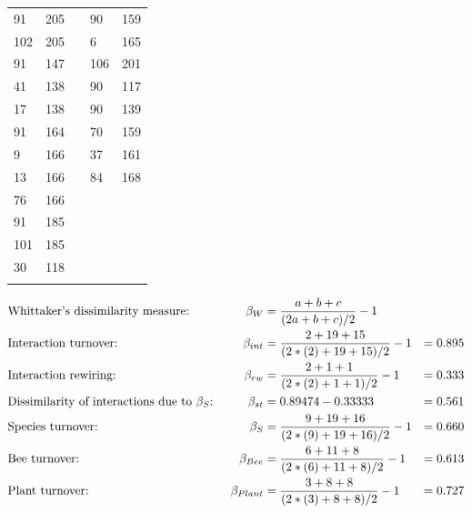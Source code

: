 \documentclass[11pt]{article}
\begin{document}
\begin{table}[h]
\begin{tabular}{|l|l|lll}
\cellcolor[HTML]{E3E5F9}91 & 205 & \multicolumn{1}{l|}{} & \multicolumn{1}{l|}{\cellcolor[HTML]{E3E5F9}90} & \multicolumn{1}{l|}{159} \\ \hhline{--~--}
102 & 205 & \multicolumn{1}{l|}{} & \multicolumn{1}{l|}{\cellcolor[HTML]{E3E5F9}6} & \multicolumn{1}{l|}{165} \\ \hhline{--~--} 
\cellcolor[HTML]{E3E5F9}91 & \cellcolor[HTML]{DDF4DC}147 & \multicolumn{1}{l|}{} & \multicolumn{1}{l|}{106} & \multicolumn{1}{l|}{201} \\ \hhline{--~--}
41 & 138 & \multicolumn{1}{l|}{} & \multicolumn{1}{l|}{\cellcolor[HTML]{E3E5F9}90} & \multicolumn{1}{l|}{117} \\ \hhline{--~--}
\cellcolor[HTML]{E3E5F9}17 & 138 & \multicolumn{1}{l|}{} & \multicolumn{1}{l|}{\cellcolor[HTML]{E3E5F9}90} & \multicolumn{1}{l|}{139} \\ \hhline{--~--}
\cellcolor[HTML]{E3E5F9}91 & 164 & \multicolumn{1}{l|}{} & \multicolumn{1}{l|}{70} & \multicolumn{1}{l|}{159} \\ \hhline{--~--} 
9 & 166 & \multicolumn{1}{l|}{} & \multicolumn{1}{l|}{37} & \multicolumn{1}{l|}{161} \\ \hhline{--~--} 
13 & 166 & \multicolumn{1}{l|}{} & \multicolumn{1}{l|}{\cellcolor[HTML]{E3E5F9}84} & \multicolumn{1}{l|}{\cellcolor[HTML]{DDF4DC}168} \\ \hhline{--~--}
76 & 166 &  &  &  \\ \hhline{--~~~}
\cellcolor[HTML]{E3E5F9}91 & \cellcolor[HTML]{DDF4DC}185 &  &  &  \\ \hhline{--~~~}
101 & \cellcolor[HTML]{DDF4DC}185 &  &  &  \\ \hhline{--~~~}
30 & 118 &  &  &  \\ \hhline{--~~~}
\end{tabular}
\end{table}
\vspace{-1cm}
\begin{align*}
	& \textnormal{Whittaker's dissimilarity measure: } & \beta_{W} & = \frac{a + b + c}{(2a + b + c)/2} - 1 \\
	 &\textnormal{Interaction turnover: } & \beta_{int} & = \frac{2 + 19 + 15}{(2*(2) + 19 + 15)/2} - 1 & = 0.895\\
	 &\textnormal{Interaction rewiring: } & \beta_{rw} & = \frac{2 + 1 + 1}{(2*(2) + 1 + 1)/2} - 1 & = 0.333\\
	 &\textnormal{Dissimilarity of interactions due to $\beta_{S}$: } & \beta_{st} & = 0.89474 - 0.33333 & = 0.561 \\
	 &\textnormal{Species turnover: } & \beta_{S} & = \frac{9 + 19 + 16}{(2*(9) + 19 + 16)/2} - 1 & = 0.660\\
	 &\textnormal{Bee turnover: } & \beta_{Bee} & = \frac{6 + 11 + 8}{(2*(6) + 11 + 8)/2} - 1 & = 0.613\\
	 &\textnormal{Plant turnover: } & \beta_{Plant} & = \frac{3 + 8 + 8}{(2*(3) + 8 + 8)/2} - 1 & = 0.727\\
\end{align*}
\end{document}
